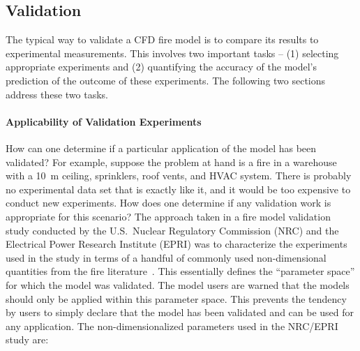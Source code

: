 \documentclass[graybox]{svmult}
\begin{document}
\subsection{Validation}

The typical way to validate a CFD fire model is to compare its results to experimental measurements. This involves two important tasks -- (1) selecting appropriate experiments and (2) quantifying the accuracy of the model's prediction of the outcome of these experiments. The following two sections address these two tasks.

\paragraph{Applicability of Validation Experiments}

How can one determine if a particular application of the model has been validated? For example, suppose the problem at hand is a fire in a warehouse with a 10~m ceiling, sprinklers, roof vents, and HVAC system. There is probably no experimental data set that is exactly like it, and it would be too expensive to conduct new experiments. How does one determine if any validation work is appropriate for this scenario? The approach taken in a fire model validation study conducted by the U.S.~Nuclear Regulatory Commission (NRC) and the Electrical Power Research Institute (EPRI) was to characterize the experiments used in the study in terms of a handful of commonly used non-dimensional quantities from the fire literature~\cite{Hill:2007}. This essentially defines the ``parameter space'' for which the model was validated. The model users are warned that the models should only be applied within this parameter space. This prevents the tendency by users to simply declare that the model has been validated and can be used for any application. The non-dimensionalized parameters used in the NRC/EPRI study are:
\end{document}
